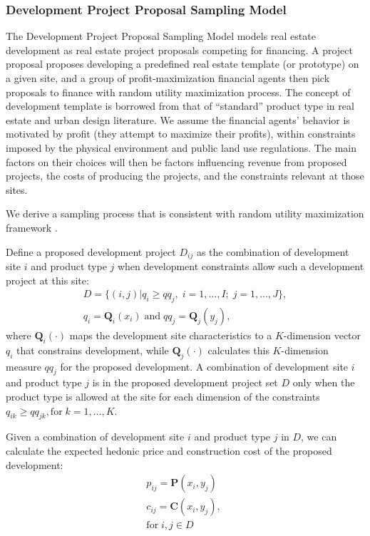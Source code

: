 \subsubsection{Development Project Proposal Sampling Model}
\label{sec:model-system-development-project-proposal-sampling-model}
%
The Development Project Proposal Sampling Model models real
estate development as real estate project proposals
competing for financing.  A project proposal proposes
developing a predefined real estate template (or prototype)
on a given site, and a group of profit-maximization
financial agents then pick proposals to finance with random
utility maximization process.  The concept of development
template is borrowed from that of ``standard'' product type
in real estate \cite{Hooper1999} and urban design
literature\cite{Song2007}.  We assume the financial agents'
behavior is motivated by profit (they attempt to maximize
their profits), within constraints imposed by the physical
environment and public land use regulations.  The main
factors on their choices will then be factors influencing
revenue from proposed projects, the costs of
producing the projects, and the constraints
relevant at those sites.

We derive a sampling process that is consistent with random
utility maximization framework \cite{Wang2008}.

Define a proposed development project $D_{ij}$ as the
combination of development site $i$ and product type $j$
when development constraints allow such a development
project at this site:
\begin{eqnarray}
  D = \{(i, j) | q_i \ge qq_j, \; i=1,\ldots,I; \;j=1,\ldots,J \}, \\
  q_i = \mathbf{Q}_i(x_i) \; \mbox{and} \; qq_j = \mathbf{Q}_j(y_j),  \nonumber
\end{eqnarray}
where $\mathbf{Q}_i(\cdot)$ maps the development site
characteristics to a $K$-dimension vector $q_i$ that
constrains development, while $\mathbf{Q}_j(\cdot)$
calculates this $K$-dimension measure $qq_j$ for the
proposed development.  A combination of development site $i$
and product type $j$ is in the proposed development project
set $D$ only when the product type is allowed at the site
for each dimension of the constraints $q_{ik} \ge qq_{jk},
\mbox{for} \; k=1,\ldots, K$.

Given a combination of development site $i$ and product type
$j$ in $D$, we can calculate the expected hedonic price and
construction cost of the proposed development:
\begin{eqnarray}
    p_{ij} = \mathbf{P}(x_i, y_j) \; \label{func:p} \\
    c_{ij} = \mathbf{C}(x_i, y_j), \;  \\
    \mbox{for} \; i, j \in D  \nonumber
\end{eqnarray}

